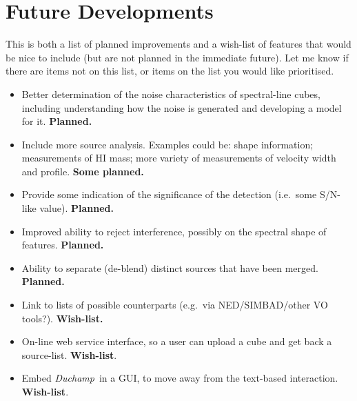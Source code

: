 \documentclass[12pt,a4paper]{article}
\newcommand{\eg}{e.g.\ }
\newcommand{\ie}{i.e.\ }
\newcommand{\duchamp}{\emph{Duchamp}}
\begin{document}
\section{Future Developments}

This is both a list of planned improvements and a wish-list of
features that would be nice to include (but are not planned in the
immediate future). Let me know if there are items not on this list, or
items on the list you would like prioritised.

\begin{itemize}

\item Better determination of the noise characteristics of
  spectral-line cubes, including understanding how the noise is
  generated and developing a model for it. \textbf{Planned.}
  
\item Include more source analysis. Examples could be: shape
  information; measurements of HI mass; more variety of measurements
  of velocity width and profile. \textbf{Some planned.}

\item Provide some indication of the significance of the detection
  (\ie some S/N-like value). \textbf{Planned.}

\item Improved ability to reject interference, possibly on the
  spectral shape of features. \textbf{Planned.}

\item Ability to separate (de-blend) distinct sources that have been
  merged. \textbf{Planned.}

\item Link to lists of possible counterparts (\eg via NED/SIMBAD/other
  VO tools?). \textbf{Wish-list.} 

\item On-line web service interface, so a user can upload a cube and
  get back a source-list. \textbf{Wish-list}.

\item Embed \duchamp\ in a GUI, to move away from the text-based
  interaction. \textbf{Wish-list}.
\end{itemize}
\end{document}
